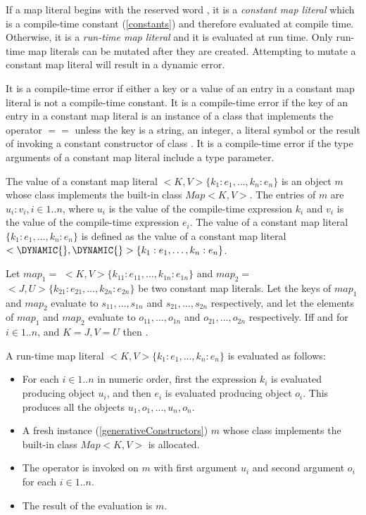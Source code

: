 \documentclass{article}
\begin{document}
\LMHash{}
If a map literal begins with the reserved word \CONST{}, it is a {\em constant map literal} which is a compile-time constant (\ref{constants}) and therefore evaluated at compile time.
Otherwise, it is a {\em run-time map literal} and it is evaluated at run time.
Only run-time map literals can be mutated after they are created.
Attempting to mutate a constant map literal will result in a dynamic error.

\LMHash{}
It is a compile-time error if either a key or a value of an entry in a constant map literal is not a compile-time constant.
It is a compile-time error if the key of an entry in a constant map literal is an instance of a class that implements the operator $==$ unless the key is a
string, an integer, a literal symbol or the result of invoking a constant constructor of class .
It is a compile-time error if the type arguments of a constant map literal include a type parameter.

\LMHash{}
The value of a constant map literal \CONST{}$ <K, V>\{k_1:e_1, \ldots, k_n :e_n\}$ is an object $m$ whose class implements the built-in class $Map<K, V>$.
The entries of $m$ are $u_i:v_i, i \in 1 .. n$, where $u_i$ is the value of the compile-time expression $k_i$ and $v_i$ is the value of the compile-time expression $e_i$.
The value of a constant map literal \CONST{} $\{k_1:e_1, \ldots, k_n :e_n\}$ is defined as the value of a constant map literal \CONST{} $<\DYNAMIC{}, \DYNAMIC{}>\{k_1:e_1, \ldots, k_n:e_n\}$.

\LMHash{}
Let $map_1 =$ \CONST{}$ <K, V>\{k_{11}:e_{11}, \ldots, k_{1n} :e_{1n}\}$ and $map_2 =$ \CONST{}$ <J, U>\{k_{21}:e_{21}, \ldots, k_{2n} :e_{2n}\}$ be two constant map literals.
Let the keys of $map_1$ and $map_2$ evaluate to $s_{11}, \ldots, s_{1n}$ and $s_{21}, \ldots, s_{2n}$ respectively, and let the elements of $map_1$ and $map_2$ evaluate to $o_{11}, \ldots, o_{1n}$ and $o_{21}, \ldots, o_{2n}$ respectively.
If{}f  and  for $i \in 1 .. n$, and $K = J, V = U$ then .


\LMHash{}
A run-time map literal $<K, V>\{k_1:e_1, \ldots, k_n :e_n\}$ is evaluated as follows:
\begin{itemize}
\item
For each $i \in 1 .. n$ in numeric order,
first the expression $k_i$ is evaluated producing object $u_i$,
and then $e_i$ is evaluated producing object $o_i$.
This produces all the objects $u_1, o_1, \ldots, u_n, o_n$.
\item A fresh instance (\ref{generativeConstructors}) $m$ whose class implements the built-in class $Map<K, V>$ is allocated.
\item
The operator \code{[]=} is invoked on $m$ with first argument $u_i$ and second argument $o_i$ for each $i \in 1 .. n$.
\item
The result of the evaluation is $m$.
\end{itemize}
\end{document}
